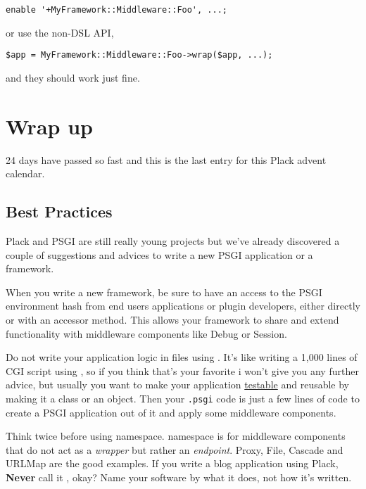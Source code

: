 \begin{lstlisting}
enable '+MyFramework::Middleware::Foo', ...;
\end{lstlisting}
%
or use the non-DSL API,

\begin{lstlisting}
$app = MyFramework::Middleware::Foo->wrap($app, ...);
\end{lstlisting}
%
and they should work just fine.

\chapter{Wrap up}\label{day-24-wrap-up}

24 days have passed so fast and this is the last entry for this Plack
advent calendar.

\section{Best Practices}\label{best-practices}

Plack and PSGI are still really young projects but we've already
discovered a couple of suggestions and advices to write a new PSGI
application or a framework.

When you write a new framework, be sure to have an access to the PSGI
environment hash from end users applications or plugin developers,
either directly or with an accessor method. This allows your framework
to share and extend functionality with middleware components like Debug
or Session.

Do not write your application logic in  files using
. It's like writing a 1{,}000 lines of CGI script using
, so if you think that's your favorite i won't give you any
further advice, but usually you want to make your application
\href{http://advent.plackperl.org/2009/12/day-13-use-placktest-to-test-your-application.html}{testable}
and reusable by making it a class or an object. Then your
\lstinline!.psgi! code is just a few lines of code to create a PSGI
application out of it and apply some middleware components.

Think twice before using  namespace.  namespace
is for middleware components that do not act as a \emph{wrapper} but
rather an \emph{endpoint}. Proxy, File, Cascade and URLMap are the good
examples. If you write a blog application using Plack, \textbf{Never}
call it , okay? Name your software by what it does, not
how it's written.

